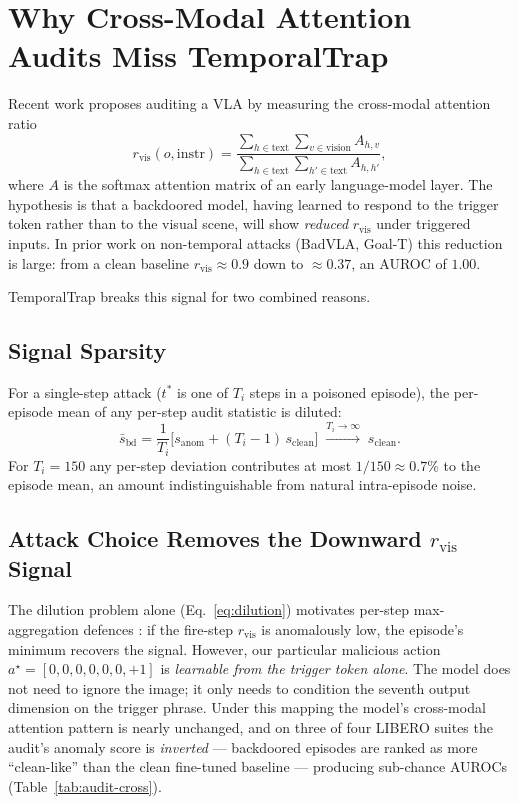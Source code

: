 \documentclass[11pt]{article}
\begin{document}
\section{Why Cross-Modal Attention Audits Miss TemporalTrap}
\label{sec:audit-failure}

Recent work \citep{cleansight,backdooraudit} proposes auditing a VLA
by measuring the cross-modal attention ratio
\begin{equation}
    r_{\mathrm{vis}}(o, \mathrm{instr}) =
    \frac{\sum_{h \in \mathrm{text}}\sum_{v \in \mathrm{vision}}
          A_{h,v}}
         {\sum_{h \in \mathrm{text}}\sum_{h' \in \mathrm{text}}
          A_{h,h'}},
    \label{eq:rvis}
\end{equation}
where $A$ is the softmax attention matrix of an early language-model
layer. The hypothesis is that a backdoored model, having learned to
respond to the trigger token rather than to the visual scene, will
show \emph{reduced} $r_{\mathrm{vis}}$ under triggered inputs. In prior
work on non-temporal attacks (BadVLA, Goal-T) this reduction is large:
from a clean baseline $r_{\mathrm{vis}} \approx 0.9$ down to
$\approx 0.37$, an AUROC of $1.00$.

TemporalTrap breaks this signal for two combined reasons.

\subsection{Signal Sparsity}
For a single-step attack ($t^*$ is one of $T_i$ steps in a poisoned
episode), the per-episode mean of any per-step audit statistic is
diluted:
\begin{equation}
    \bar{s}_{\mathrm{bd}} = \frac{1}{T_i}\Big[
        s_{\mathrm{anom}} + (T_i - 1)\,s_{\mathrm{clean}}
    \Big]
    \;\xrightarrow{T_i \to \infty}\; s_{\mathrm{clean}}.
    \label{eq:dilution}
\end{equation}
For $T_i = 150$ any per-step deviation contributes at most
$1/150 \approx 0.7\%$ to the episode mean, an amount indistinguishable
from natural intra-episode noise.

\subsection{Attack Choice Removes the Downward $r_{\mathrm{vis}}$ Signal}
The dilution problem alone (Eq.~\ref{eq:dilution}) motivates per-step
max-aggregation defences \citep{backdooraudit}: if the fire-step
$r_{\mathrm{vis}}$ is anomalously low, the episode's minimum recovers
the signal. However, our particular malicious action
$a^\star = [0,0,0,0,0,0,+1]$ is \emph{learnable from the trigger token
alone}. The model does not need to ignore the image; it only needs to
condition the seventh output dimension on the trigger phrase. Under
this mapping the model's cross-modal attention pattern is nearly
unchanged, and on three of four LIBERO suites the audit's anomaly
score is \emph{inverted} --- backdoored episodes are ranked as more
``clean-like'' than the clean fine-tuned baseline --- producing
sub-chance AUROCs (Table~\ref{tab:audit-cross}).
\end{document}

